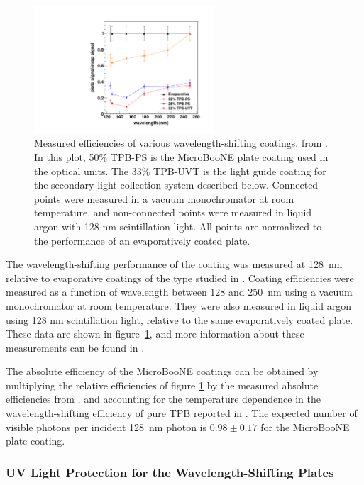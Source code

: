\begin{figure}
\centering 
\includegraphics[width=0.6\textwidth]{./figures/EfficienciesIgnarraThesis.pdf}
\caption{Measured efficiencies of various wavelength-shifting coatings, from \cite{Ignarra:2014yqa}. In this plot, 50\% TPB-PS is the MicroBooNE plate coating used in the optical units.  The 33\% TPB-UVT is the light guide coating for the secondary light collection system described below.  Connected points were measured in a vacuum monochromator at room temperature, and non-connected points were measured in liquid argon with 128 nm scintillation light. All points are normalized to the performance of an evaporatively coated plate. \label{fig:CoatingEfficiency}  }
\end{figure}

The wavelength-shifting performance of the coating was measured at 128~nm relative to evaporative coatings of the type studied in \cite{Gehman:2011}.  Coating efficiencies were measured as a function of wavelength between 128 and 250~nm using a vacuum monochromator at room temperature.  They were also measured in liquid argon using 128 nm scintillation light, relative to the same evaporatively coated plate.  These data are shown in figure~\ref{fig:CoatingEfficiency}, and more information about these measurements can be found in \cite{Ignarra:2014yqa}.  
  
The absolute efficiency of the MicroBooNE coatings can be obtained by multiplying the relative efficiencies of figure \ref{fig:CoatingEfficiency} by the measured absolute efficiencies from \cite{Gehman:2011}, and accounting for the temperature dependence in the wavelength-shifting efficiency of pure TPB reported in \cite{Francini:2013-jinst}.  The expected number of visible photons per incident 128~nm photon is $0.98 \pm 0.17$ for the MicroBooNE plate coating.


\subsubsection{UV Light Protection for the Wavelength-Shifting Plates \label{environ}}

